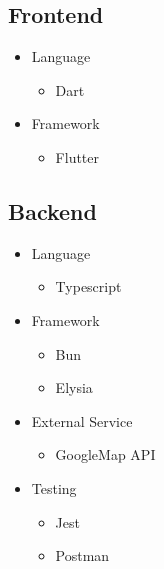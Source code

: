 \subsection{Frontend}
\begin{itemize}
	\item Language
	\begin{itemize}
		\item Dart
	\end{itemize}
\end{itemize}
\begin{itemize}
	\item Framework
	\begin{itemize}
		\item Flutter
	\end{itemize}
\end{itemize}
\subsection{Backend}
\begin{itemize}
	\item Language
	\begin{itemize}
		\item Typescript
	\end{itemize}
\end{itemize}
\begin{itemize}
	\item Framework
	\begin{itemize}
		\item Bun
		\item Elysia
	\end{itemize}
	\item External Service
	\begin{itemize}
		\item GoogleMap API
	\end{itemize}
	\item Testing
	\begin{itemize}
		\item Jest
		\item Postman
	\end{itemize}
\end{itemize}
